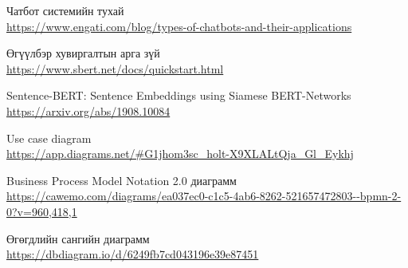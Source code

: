 \singlespace
{}
\begin{thebibliography}{99}
	Чатбот системийн тухай
	\\\url{https://www.engati.com/blog/types-of-chatbots-and-their-applications}

	Өгүүлбэр хувиргалтын арга зүй
	\\\url{https://www.sbert.net/docs/quickstart.html}
	
	Sentence-BERT: Sentence Embeddings using Siamese BERT-Networks
	\\\url{https://arxiv.org/abs/1908.10084}

	Use case diagram
	\\\url{https://app.diagrams.net/#G1jhom3sc_holt-X9XLALtQja_Gl_Eykhj}

	Business Process Model Notation 2.0 диаграмм
	\\\url{https://cawemo.com/diagrams/ea037ec0-c1c5-4ab6-8262-521657472803--bpmn-2-0?v=960,418,1}

	Өгөгдлийн сангийн диаграмм
	\\\url{https://dbdiagram.io/d/6249fb7cd043196e39e87451}
\end{thebibliography}
